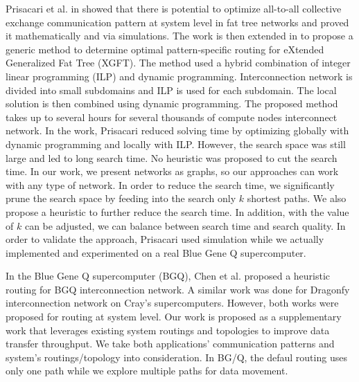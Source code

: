 Prisacari et al. in \cite{Prisacari13a} showed that there is potential to optimize all-to-all collective exchange communication pattern at system level in fat tree networks and proved it mathematically and via simulations. The work is then extended in \cite{Prisacari13b} to propose a generic method to determine optimal pattern-specific routing for eXtended Generalized Fat Tree (XGFT). The method used a hybrid combination of integer linear programming (ILP) and dynamic programming. Interconnection network is divided into small subdomains and ILP is used for each subdomain. The local solution is then combined using dynamic programming. The proposed method takes up to several hours for several thousands of compute nodes interconnect network. In the work, Prisacari reduced solving time by optimizing globally with dynamic programming and locally with ILP. However, the search space was still large and led to long search time. No heuristic was proposed to cut the search time. In our work, we present networks as graphs, so our approaches can work with any type of network. In order to reduce the search time, we significantly prune the search space by feeding into the search only $k$ shortest paths. We also propose a heuristic to further reduce the search time. In addition, with the value of $k$ can be adjusted, we can balance between search time and search quality. In order to validate the approach, Prisacari used simulation while we actually implemented and experimented on a real Blue Gene Q supercomputer.

In the Blue Gene Q supercomputer (BGQ), Chen et al. \cite{Chen:BGQ} proposed a heuristic routing for BGQ interconnection network. A similar \cite{garcia2013:CrayDragonfly} work was done for Dragonfy interconnection network on Cray's supercomputers. However, both works were proposed for routing at system level. Our work is proposed as a supplementary work that leverages existing system routings and topologies to improve data transfer throughput. We take both applications' communication patterns and system's routings/topology into consideration. In BG/Q, the defaul routing uses only one path while we explore multiple paths for data movement. 


